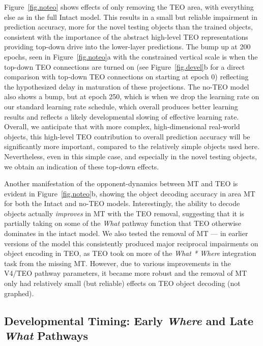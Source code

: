 \documentclass[11pt,twoside]{article}
\newif\myifpdf
\begin{document}
Figure~\ref{fig.noteo} shows effects of only removing the TEO area, with everything else as in the full Intact model.  This results in a small but reliable impairment in prediction accuracy, more for the novel testing objects than the trained objects, consistent with the importance of the abstract high-level TEO representations providing top-down drive into the lower-layer predictions. The bump up at 200 epochs, seen in Figure~\ref{fig.noteo}a with the constrained vertical scale is when the top-down TEO connections are turned on (see Figure~\ref{fig.devel}b for a direct comparison with top-down TEO connections on starting at epoch 0) reflecting the hypothesized delay in maturation of these projections.  The no-TEO model also shows a bump, but at epoch 250, which is when we drop the learning rate on our standard learning rate schedule, which overall produces better learning results and reflects a likely developmental slowing of effective learning rate.  Overall, we anticipate that with more complex, high-dimensional real-world objects, this high-level TEO contribution to overall prediction accuracy will be significantly more important, compared to the relatively simple objects used here.  Nevertheless, even in this simple case, and especially in the novel testing objects, we obtain an indication of these top-down effects.

Another manifestation of the opponent-dynamics between MT and TEO is evident in Figure~\ref{fig.noteo}b, showing the object decoding accuracy in area MT for both the Intact and no-TEO models.  Interestingly, the ability to decode objects actually {\em improves} in MT with the TEO removal, suggesting that it is partially taking on some of the {\em What} pathway function that TEO otherwise dominates in the intact model.   We also tested the removal of MT --- in earlier versions of the model this consistently produced major reciprocal impairments on object encoding in TEO, as TEO took on more of the {\em What * Where} integration task from the missing MT.  However, due to various improvements in the V4/TEO pathway parameters, it became more robust and the removal of MT only had relatively small (but reliable) effects on TEO object decoding (not graphed).

\subsection{Developmental Timing: Early {\em Where} and Late {\em What} Pathways}
\end{document}
